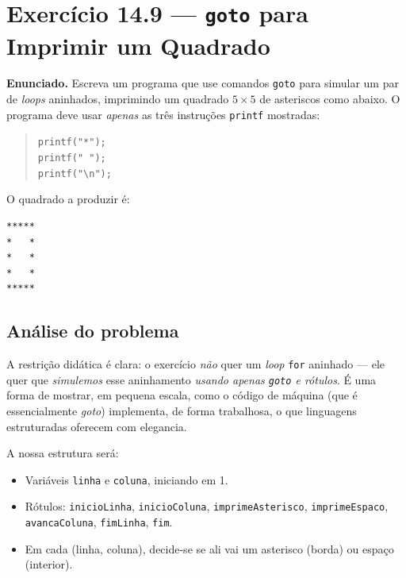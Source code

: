 \documentclass[11pt,a4paper]{article}
\begin{document}
\newpage
\section{Exerc\'icio 14.9 --- \texttt{goto} para Imprimir um Quadrado}

\begin{enunciado}
\textbf{Enunciado.} Escreva um programa que use comandos \texttt{goto} para simular um par de \emph{loops} aninhados, imprimindo um quadrado $5 \times 5$ de asteriscos como abaixo. O programa deve usar \emph{apenas} as tr\^es instru\c{c}\~oes \texttt{printf} mostradas:

\begin{quote}
\texttt{printf("*");}\\
\texttt{printf(" ");}\\
\texttt{printf("\textbackslash n");}
\end{quote}

\noindent O quadrado a produzir \'e:
\begin{verbatim}
*****
*   *
*   *
*   *
*****
\end{verbatim}
\end{enunciado}

\subsection*{An\'alise do problema}

A restri\c{c}\~ao did\'atica \'e clara: o exerc\'icio \emph{n\~ao} quer um \emph{loop} \texttt{for} aninhado --- ele quer que \emph{simulemos} esse aninhamento \emph{usando apenas \texttt{goto} e r\'otulos}. \'E uma forma de mostrar, em pequena escala, como o c\'odigo de m\'aquina (que \'e essencialmente \emph{goto}) implementa, de forma trabalhosa, o que linguagens estruturadas oferecem com elegancia.

A nossa estrutura ser\'a:

\begin{itemize}[leftmargin=*]
  \item Vari\'aveis \texttt{linha} e \texttt{coluna}, iniciando em 1.
  \item R\'otulos: \texttt{inicioLinha}, \texttt{inicioColuna}, \texttt{imprimeAsterisco}, \texttt{imprimeEspaco}, \texttt{avancaColuna}, \texttt{fimLinha}, \texttt{fim}.
  \item Em cada (linha, coluna), decide-se se ali vai um asterisco (borda) ou espa\c{c}o (interior).
\end{itemize}
\end{document}
